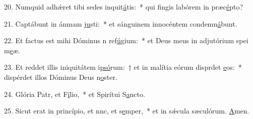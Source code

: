 20. Numquid adhǽret tibi sedes inquit\uline{á}tis:~* qui fingis labórem in præc\uline{é}pto?\par 
21. Captábunt in ánmam j\uline{u}sti:~* et sánguinem innocéntem condemn\uline{á}bunt.\par 
22. Et factus est mihi Dóminus n ref\uline{ú}gium:~* et Deus meus in adjutórium spei m\uline{e}æ.\par 
23. Et reddet illis iniquitátem i\uline{psó}rum:~† et in malítia eórum disprdet \uline{e}os:~* dispérdet illos Dóminus Deus n\uline{o}ster.\par 
24. Glória Patr, et F\uline{í}lio,~* et Spirítui S\uline{a}ncto.\par 
25. Sicut erat in princípio, et nnc, et s\uline{e}mper,~* et in sǽcula sæculórum. \uline{A}men.\par 

